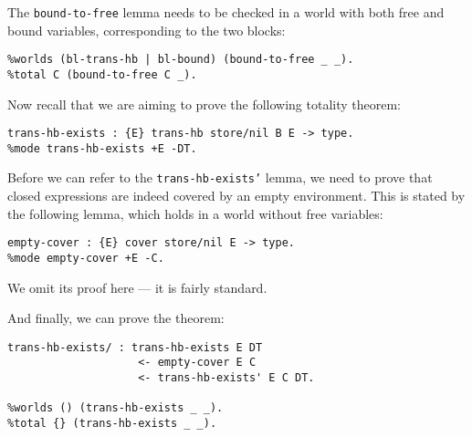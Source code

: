 The \texttt{bound-to-free} lemma needs to be checked in a world with both free and bound variables, corresponding to the two blocks:
\begin{verbatim}
%worlds (bl-trans-hb | bl-bound) (bound-to-free _ _).
%total C (bound-to-free C _).
\end{verbatim}

Now recall that we are aiming to prove the following totality theorem:
\begin{verbatim}
trans-hb-exists : {E} trans-hb store/nil B E -> type.
%mode trans-hb-exists +E -DT.
\end{verbatim}
Before we can refer to the \texttt{trans-hb-exists'} lemma, we need to prove that closed expressions are indeed covered by an empty environment.
This is stated by the following lemma, which holds in a world without free variables:
\begin{verbatim}
empty-cover : {E} cover store/nil E -> type.
%mode empty-cover +E -C.
\end{verbatim}
We omit its proof here --- it is fairly standard.

And finally, we can prove the theorem:
\begin{verbatim}
trans-hb-exists/ : trans-hb-exists E DT
                    <- empty-cover E C
                    <- trans-hb-exists' E C DT.

%worlds () (trans-hb-exists _ _).
%total {} (trans-hb-exists _ _).
\end{verbatim}
